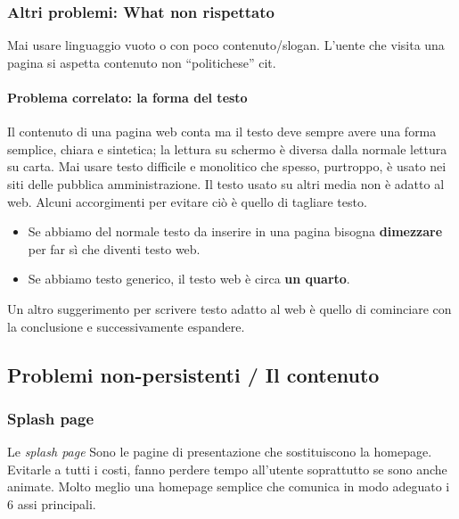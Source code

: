		\subsubsection{Altri problemi: What non rispettato}
			Mai usare linguaggio vuoto o con poco contenuto/slogan. L'uente che visita una pagina si aspetta contenuto non ``politichese'' cit.
			
			\paragraph{Problema correlato: la forma del testo}
				Il contenuto di una pagina web conta ma il testo deve sempre avere una forma semplice, chiara e sintetica; la lettura su schermo è diversa dalla normale lettura su carta. Mai usare testo difficile e monolitico che spesso, purtroppo, è usato nei siti delle pubblica amministrazione. Il testo usato su altri media non è adatto al web. Alcuni accorgimenti per evitare ciò è quello di tagliare testo.
				\begin{itemize}
					\item Se abbiamo del normale testo da inserire in una pagina bisogna \textbf{dimezzare} per far sì che diventi testo web.
					\item Se abbiamo testo generico, il testo web è circa \textbf{un quarto}.
				\end{itemize}
				Un altro suggerimento per scrivere testo adatto al web è quello di cominciare con la conclusione e successivamente espandere.
	
	\subsection{Problemi non-persistenti / Il contenuto}
	
		\subsubsection{Splash page}
			Le \emph{splash page} Sono le pagine di presentazione che sostituiscono la homepage. Evitarle a tutti i costi, fanno perdere tempo all'utente soprattutto se sono anche animate. Molto meglio una homepage semplice che comunica in modo adeguato i 6 assi principali.
